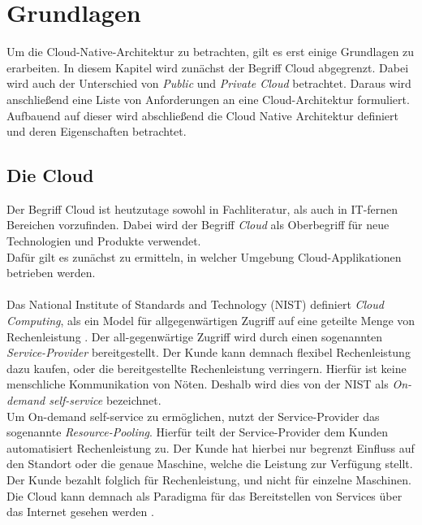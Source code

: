 \chapter{Grundlagen}
\label{ch:grundlagen}
Um die Cloud-Native-Architektur zu betrachten, gilt es erst einige Grundlagen zu erarbeiten. In diesem Kapitel wird zunächst der Begriff Cloud abgegrenzt. Dabei wird auch der Unterschied von \textit{Public} und \textit{Private Cloud} betrachtet. Daraus wird anschließend eine Liste von Anforderungen an eine Cloud-Architektur formuliert. Aufbauend auf dieser wird abschließend die Cloud Native Architektur definiert und deren Eigenschaften betrachtet. 

\section{Die Cloud}
Der Begriff Cloud ist heutzutage sowohl in Fachliteratur, als auch in IT-fernen Bereichen vorzufinden. Dabei wird der Begriff \textit{Cloud} als Oberbegriff für neue Technologien und Produkte verwendet.\\ 
Dafür gilt es zunächst zu ermitteln, in welcher Umgebung Cloud-Applikationen betrieben werden.\\\\
Das National Institute of Standards and Technology (NIST) definiert \textit{Cloud Computing}, als ein Model für allgegenwärtigen Zugriff auf eine geteilte Menge von Rechenleistung . Der all-gegenwärtige Zugriff wird durch einen sogenannten \textit{Service-Provider} bereitgestellt. Der Kunde kann demnach flexibel Rechenleistung dazu kaufen, oder die bereitgestellte Rechenleistung verringern. Hierfür ist keine menschliche Kommunikation von Nöten. Deshalb wird dies von der NIST als \textit{On-demand self-service} bezeichnet.\\
Um On-demand self-service zu ermöglichen, nutzt der Service-Provider das sogenannte \textit{Resource-Pooling}. Hierfür teilt der Service-Provider dem Kunden automatisiert Rechenleistung zu. Der Kunde hat hierbei nur begrenzt Einfluss auf den Standort oder die genaue Maschine, welche die Leistung zur Verfügung stellt.\cite{mell_nist_2011}\\
Der Kunde bezahlt folglich für Rechenleistung, und nicht für einzelne Maschinen. Die Cloud kann demnach als Paradigma für das Bereitstellen von Services über das Internet gesehen werden \cite{avram_advantages_2014}.

